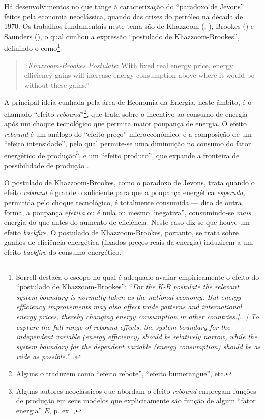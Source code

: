 \documentclass{article}[12pt]
\begin{document}
Há desenvolvimentos no que tange à caracterização do ``paradoxo de Jevons'' feitos pela economia neoclássica, quando das crises do petróleo na década de 1970. Os trabalhos fundamentais neste tema são de Khazzoom (\citeyear{Khazzoom1980}, \citeyear{Khazzoom1987}), Brookes (\citeyear{Brookes1990}) e Saunders (\citeyear{Saunders1992}), o qual cunhou a expressão ``postulado de Khazzoom-Brookes'', definindo-o como\footnote{Sorrell destaca o escopo no qual é adequado avaliar empiricamente o efeito do ``postulado de Khazzoom-Brookes'': ``\textit{For the K-B postulate the relevant system boundary is normally taken as the national economy. But energy efficiency improvements may also affect trade patterns and international energy prices, thereby changing energy consumption in other countries.[...] To capture the full range of rebound effects, the system boundary for the independent variable (energy efficiency) should be relatively narrow, while the system boundary for the dependent variable (energy consumption) should be as wide as possible.}'' \cite[p. 15]{Sorrell2007}.} 
\begin{quote}
    ``\textit{Khazzoom-Brookes Postulate}: With fixed real energy price, energy efficiency gains will increase energy consumption above where it would be without these gains.” \cite[p. 135]{Saunders1992}
\end{quote}

A principal ideia cunhada pela área de Economia da Energia, neste âmbito, é o chamado ``efeito \textit{rebound}''\footnote{Alguns o traduzem como ``efeito rebote'', ``efeito bumerangue'', etc.}, que trata sobre o incentivo ao consumo de energia após um choque tecnológico que permita maior poupança de energia. O efeito \textit{rebound} é um análogo do ``efeito preço'' microeconômico: é a composição de um ``efeito intensidade'', pelo qual permite-se uma diminuição no consumo do fator energético de produção\footnote{Alguns autores neoclássicos que abordam o efeito \textit{rebound} empregam funções de produção em seus modelos que explicitamente são função de algum ``fator energia'' $E$, p. ex. \cite{Saunders1992}, }, e um ``efeito produto'', que expande a fronteira de possibilidade de produção \cite[pp. 170-1]{Saunders2009}.

O postulado de Khazzoom-Brookes, como o paradoxo de Jevons, trata quando o efeito \textit{rebound} é grande o suficiente para que a poupança energética \textit{esperada}, permitida pelo choque tecnológico, é totalmente consumida --- dito de outra forma, a poupança \textit{efetiva} ou é nula ou mesmo ``negativa'', consumindo-se \textit{mais} energia do que antes do aumento de eficiência. Neste caso diz-se que houve um efeito \textit{backfire}. O postulado de Khazzoom-Brookes, portanto, se trata sobre ganhos de eficiência energética (fixados preços reais da energia) induzirem a um efeito \textit{backfire} do consumo energético.
\end{document}
